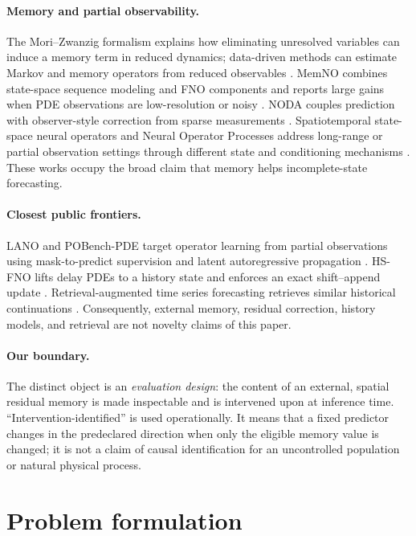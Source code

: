 \documentclass[11pt]{article}
\begin{document}
\paragraph{Memory and partial observability.}
The Mori--Zwanzig formalism explains how eliminating unresolved variables can
induce a memory term in reduced dynamics; data-driven methods can estimate
Markov and memory operators from reduced observables \cite{lin2021mori}.
MemNO combines state-space sequence modeling and FNO components and reports
large gains when PDE observations are low-resolution or noisy
\cite{ruiz2024memory}. NODA couples prediction with observer-style correction
from sparse measurements \cite{singh2024semilinear}. Spatiotemporal state-space
neural operators and Neural Operator Processes address long-range or partial
observation settings through different state and conditioning mechanisms
\cite{koren2025spatiotemporal,lara2026nop}. These works occupy the broad claim
that memory helps incomplete-state forecasting.

\paragraph{Closest public frontiers.}
LANO and POBench-PDE target operator learning from partial observations using
mask-to-predict supervision and latent autoregressive propagation
\cite{hou2026lano}. HS-FNO lifts delay PDEs to a history state and enforces an
exact shift--append update \cite{shikhman2026hsfno}. Retrieval-augmented time
series forecasting retrieves similar historical continuations
\cite{han2025raft}. Consequently, external memory, residual correction,
history models, and retrieval are not novelty claims of this paper.

\paragraph{Our boundary.}
The distinct object is an \emph{evaluation design}: the content of an external,
spatial residual memory is made inspectable and is intervened upon at inference
time. ``Intervention-identified'' is used operationally. It means that a fixed
predictor changes in the predeclared direction when only the eligible memory
value is changed; it is not a claim of causal identification for an uncontrolled
population or natural physical process.

\section{Problem formulation}
\end{document}

